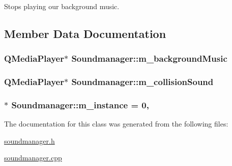 Stops playing our background music. 



\subsection{Member Data Documentation}
\hypertarget{class_soundmanager_a39e32f7d94670486c52e78721a8f4faf}{
\subsubsection[{m\+\_\+background\+Music}]{\setlength{\rightskip}{0pt plus 5cm}Q\+Media\+Player$\ast$ Soundmanager\+::m\+\_\+background\+Music\hspace{0.3cm}{\ttfamily [protected]}}}\label{class_soundmanager_a39e32f7d94670486c52e78721a8f4faf}
\hypertarget{class_soundmanager_a824f9bfdbe61a7db3cb54cb87cb80268}{
\subsubsection[{m\+\_\+collision\+Sound}]{\setlength{\rightskip}{0pt plus 5cm}Q\+Media\+Player$\ast$ Soundmanager\+::m\+\_\+collision\+Sound\hspace{0.3cm}{\ttfamily [protected]}}}\label{class_soundmanager_a824f9bfdbe61a7db3cb54cb87cb80268}
\hypertarget{class_soundmanager_a81105bb352bada9ff056335df0dd2bb3}{
\subsubsection[{m\+\_\+instance}]{ $\ast$ Soundmanager\+::m\+\_\+instance = 0\hspace{0.3cm}{\ttfamily [static]}, {\ttfamily [protected]}}}\label{class_soundmanager_a81105bb352bada9ff056335df0dd2bb3}


The documentation for this class was generated from the following files\+:\begin{DoxyCompactItemize}
\item 
\hyperlink{soundmanager_8h}{soundmanager.\+h}\item 
\hyperlink{soundmanager_8cpp}{soundmanager.\+cpp}\end{DoxyCompactItemize}
